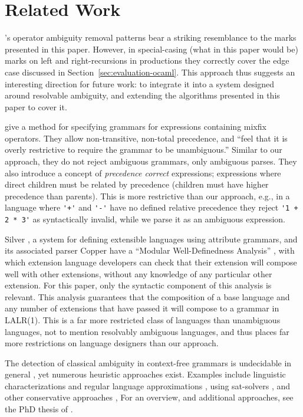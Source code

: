 \documentclass[acmsmall,review,anonymous]{acmart}\settopmatter{printfolios=true,printccs=false,printacmref=false}
\begin{document}
\section{Related Work}

\citet{afroozehSafeSpecificationOperator2013}'s operator ambiguity removal patterns bear a striking resemblance to the marks presented in this paper. However, in special-casing (what in this paper would be) marks on left and right-recursions in productions they correctly cover the edge case discussed in Section~\ref{sec:evaluation-ocaml}. This approach thus suggests an interesting direction for future work: to integrate it into a system designed around resolvable ambiguity, and extending the algorithms presented in this paper to cover it.

\citet{danielssonParsingMixfixOperators2011} give a method for specifying grammars for expressions containing mixfix operators. They allow non-transitive, non-total precedence, and ``feel that it is overly restrictive to require the grammar to be unambiguous.'' Similar to our approach, they do not reject ambiguous grammars, only ambiguous parses. They also introduce a concept of \emph{precedence correct} expressions; expressions where direct children must be related by precedence (children must have higher precedence than parents). This is more restrictive than our approach, e.g., in a language where \verb|'+'| and \verb|'-'| have no defined relative precedence they reject \verb|'1 + 2 * 3'| as syntactically invalid, while we parse it as an ambiguous expression.

Silver \cite{vanwykSilverExtensibleAttribute2010}, a system for defining extensible languages using attribute grammars, and its associated parser Copper \cite{} have a ``Modular Well-Definedness Analysis'' \cite{kaminskiModularWellDefinednessAnalysis2013}, with which extension language developers can check that their extension will compose well with other extensions, without any knowledge of any particular other extension. For this paper, only the syntactic component \cite{schwerdfegerVerifiableCompositionDeterministic2009} of this analysis is relevant. This analysis guarantees that the composition of a base language and any number of extensions that have passed it will compose to a grammar in LALR(1). This is a far more restricted class of languages than unambiguous languages, not to mention resolvably ambiguous languages, and thus places far more restrictions on language designers than our approach.

The detection of classical ambiguity in context-free grammars is undecidable in general \cite{cantorAmbiguityProblemBackus1962}, yet numerous heuristic approaches exist. Examples include linguistic characterizations and regular language approximations \cite{brabrandAnalyzingAmbiguityContextFree2007}, using sat-solvers \cite{axelssonAnalyzingContextFreeGrammars2008}, and other conservative approaches \cite{schmitzConservativeAmbiguityDetection2007}, For an overview, and additional approaches, see the PhD thesis of \citet{bastenAmbiguityDetectionProgramming2011}.
\end{document}
